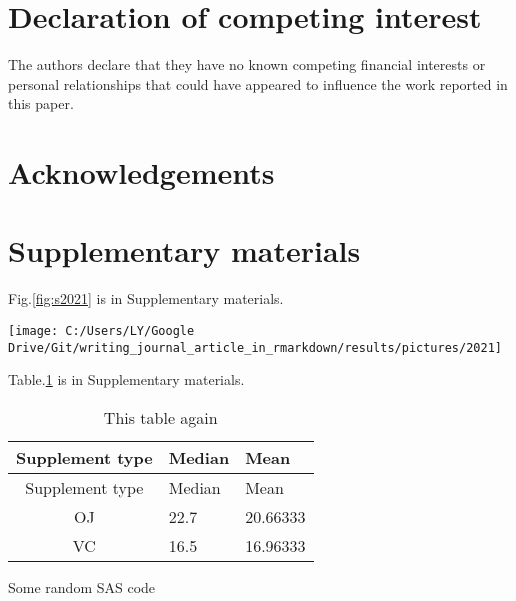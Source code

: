 \documentclass[]{elsarticle} %
\let\origfigure\figure
\let\endorigfigure\endfigure
\renewenvironment{figure}[1][2] {
    \expandafter\origfigure\expandafter[H]
} {
    \endorigfigure
}
\begin{document}
\section*{Declaration of competing interest}\label{declaration}

The authors declare that they have no known competing financial
interests or personal relationships that could have appeared to
influence the work reported in this paper.

\section*{Acknowledgements}\label{thanks}

\section*{Supplementary materials}\label{appendix}

\renewcommand{\thefigure}{S\arabic{figure}}

\setcounter{figure}{0} \renewcommand{\thetable}{S\arabic{table}}
\setcounter{table}{0} \renewcommand{\theequation}{S\arabic{equation}}
\setcounter{equation}{0}

Fig.\ref{fig:s2021} is in Supplementary materials.

\begin{figure}

{\centering \texttt{[image: C:/Users/LY/Google Drive/Git/writing\_journal\_article\_in\_rmarkdown/results/pictures/2021]} 

}

\caption{A plot in Supplementary Materials}\label{fig:s2021}
\end{figure}

Table.\ref{tab:stable} is in Supplementary materials.

\begin{longtable}[]{@{}cll@{}}
\caption{\label{tab:unnamed-chunk-4}\label{tab:stable}This table
again}\tabularnewline
\toprule
Supplement type & Median & Mean\tabularnewline
\midrule
\endfirsthead
\toprule
Supplement type & Median & Mean\tabularnewline
\midrule
\endhead
OJ & 22.7 & 20.66333\tabularnewline
VC & 16.5 & 16.96333\tabularnewline
\bottomrule
\end{longtable}

Some random SAS code
\end{document}
